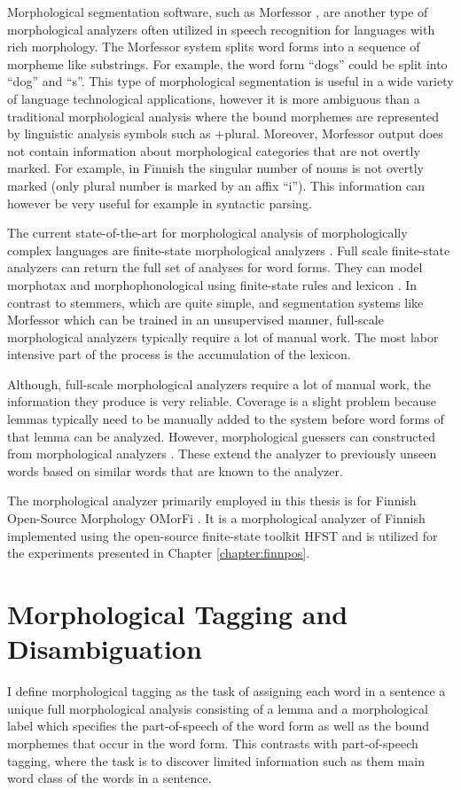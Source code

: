 Morphological segmentation software, such as Morfessor
\cite{Creutz2002}, are another type of morphological analyzers often
utilized in speech recognition for languages with rich morphology. The
Morfessor system splits word forms into a sequence of morpheme like
substrings. For example, the word form ``dogs'' could be split into
``dog'' and ``s''.  This type of morphological segmentation is useful
in a wide variety of language technological applications, however it
is more ambiguous than a traditional morphological analysis where the
bound morphemes are represented by linguistic analysis symbols such as
+plural. Moreover, Morfessor output does not contain information about
morphological categories that are not overtly marked. For example, in
Finnish the singular number of nouns is not overtly marked (only
plural number is marked by an affix ``i''). This information can
however be very useful for example in syntactic parsing.

The current state-of-the-art for morphological analysis of
morphologically complex languages are finite-state morphological
analyzers \citep{Kaplan1994,Koskenniemi1984}. Full scale finite-state
analyzers can return the full set of analyses for word forms. They can
model morphotax and morphophonological using finite-state rules and
lexicon \citep{Beesley2003}. In contrast to stemmers, which are quite
simple, and segmentation systems like Morfessor which can be trained
in an unsupervised manner, full-scale morphological analyzers
typically require a lot of manual work. The most labor intensive part
of the process is the accumulation of the lexicon. 

Although, full-scale morphological analyzers require a lot of manual
work, the information they produce is very reliable. Coverage is a
slight problem because lemmas typically need to be manually added to
the system before word forms of that lemma can be analyzed. However,
morphological guessers can constructed from morphological analyzers
\cite{Linden2009}. These extend the analyzer to previously unseen
words based on similar words that are known to the analyzer.

The morphological analyzer primarily employed in this thesis is for
Finnish Open-Source Morphology OMorFi \citep{Pirinen2011}. It is a
morphological analyzer of Finnish implemented using the open-source
finite-state toolkit HFST \cite{Linden2009hfst} and is utilized for
the experiments presented in Chapter \ref{chapter:finnpos}.
 
\section{Morphological Tagging and Disambiguation}
I define morphological tagging as the task of assigning each word in a
sentence a unique full morphological analysis consisting of a lemma
and a morphological label which specifies the part-of-speech of the
word form as well as the bound morphemes that occur in the word
form. This contrasts with part-of-speech tagging, where the task is to
discover limited information such as them main word class of the words
in a sentence.

